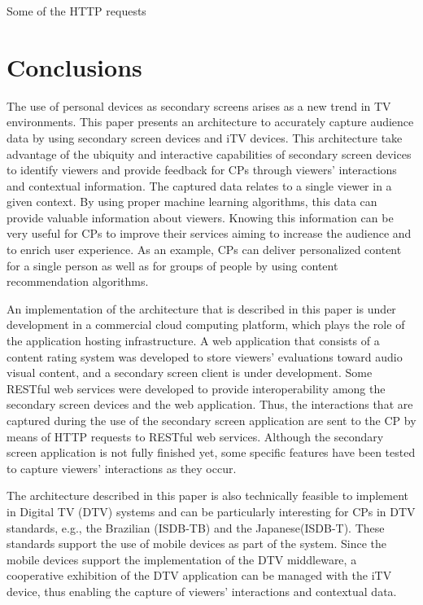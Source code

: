 \documentclass[journal]{IEEEtran}
\begin{document}
Some of the HTTP requests

\section{Conclusions}

The use of personal devices as secondary screens arises as a new trend in TV environments. This paper presents an architecture to accurately capture audience data by using secondary screen devices and iTV devices. This architecture take advantage of the ubiquity and interactive capabilities of secondary screen devices to identify viewers and provide feedback for CPs through viewers' interactions and contextual information. The captured data relates to a single viewer in a given context. By using proper machine learning algorithms, this data can provide valuable information about viewers. Knowing this information can be very useful for CPs to improve their services aiming to increase the audience and to enrich user experience. As an example, CPs can deliver personalized content for a single person as well as for groups of people by using content recommendation algorithms.

An implementation of the architecture that is described in this paper is under development in a commercial cloud computing platform, which plays the role of the application hosting infrastructure. A web application that consists of a content rating system was developed to store  viewers' evaluations toward audio visual content, and a secondary screen client is under development. Some RESTful web services were developed to provide interoperability among the secondary screen devices and the web application. Thus, the interactions that are captured during the use of the secondary screen application are sent to the CP by means of HTTP requests to RESTful web services. Although the secondary screen application is not fully finished yet, some specific features have been tested to capture viewers' interactions as they occur.

The architecture described in this paper is also technically feasible to implement in Digital TV (DTV) systems and can be particularly interesting for CPs in DTV standards, e.g., the Brazilian (ISDB-TB) and the Japanese(ISDB-T). These standards support the use of mobile devices as part of the system. Since the mobile devices support the implementation of the DTV middleware, a cooperative exhibition of the DTV application can be managed with the iTV device, thus enabling the capture of viewers' interactions and contextual data.



\end{document}
